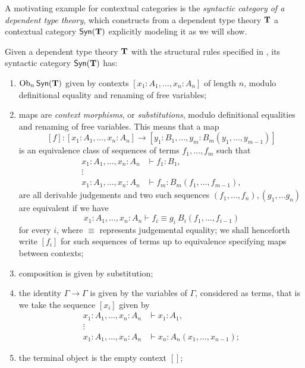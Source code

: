 A motivating example for contextual categories is the \emph{syntactic category
of a dependent type theory}, which constructs from a dependent type theory
$\operatorname{\mathbf{T}}$ a contextual category $\mathsf{Syn}(\operatorname{\mathbf{T}})$ explicitly modeling it as we will show.

\begin{construction}\cite[2.6]{Car78}
  Given a dependent type theory $\operatorname{\mathbf{T}}$ with the structural rules specified in
  \cite[A.1]{KL12}, its syntactic category $\mathsf{Syn}(\operatorname{\mathbf{T}})$ has:
  \begin{enumerate}
    \item $\operatorname{Ob}_n\mathsf{Syn}(\operatorname{\mathbf{T}})$ given by contexts $[x_1:A_1,\ldots,x_n:A_n]$ of length
      $n$, modulo definitional equality and renaming of free variables;
    \item maps are \emph{context morphisms}, or \emph{substitutions}, modulo
      definitional equalities and renaming of free variables. This means that a
      map
      \[[f]\colon[x_1:A_1,\ldots,x_n:A_n]\rightarrow[y_1:B_1,\ldots,y_m:B_m(y_1,\ldots,y_{m-1})]\]
      is an equivalence class of sequences of terms $f_1,\ldots,f_m$ such that
      \begin{align*}
        x_1:A_1,\ldots,x_n:A_n &\vdash f_1:B_1, \\
        \vdots & \\
        x_1:A_1,\ldots,x_n:A_n &\vdash f_m:B_m(f_1,\ldots,f_{m-1}),
      \end{align*}
      are all derivable judgements and two such sequences
      $(f_1,\ldots,f_n),(g_1,\ldots g_n)$ are equivalent if we have
      \[x_1:A_1,\ldots,x_n:A_n\vdash f_i\equiv g_i\:B_i(f_1,\ldots,f_{i-1})\]
      for every $i$, where $\equiv$ represents judgemental equality; we shall
      henceforth write $[f_i]$ for such sequences of terms up to equivalence
      specifying maps between contexts;
    \item composition is given by substitution;
    \item the identity $\Gamma\rightarrow\Gamma$ is given by the variables of
      $\Gamma$, considered as
      terms, that is we take the sequence $[x_i]$ given by
      \begin{align*}
        x_1:A_1,\ldots,x_n:A_n &\vdash x_1:A_1, \\
        \vdots & \\
        x_1:A_1,\ldots,x_n:A_n &\vdash x_n:A_n(x_1,\ldots,x_{n-1});
      \end{align*}
    \item the terminal object is the empty context $[]$;

\end{enumerate}
\end{construction}

